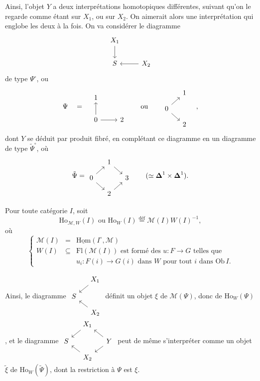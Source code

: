 \documentclass[11pt]{article}
\newcommand{\printedpage}[1]{\marginpar{\footnotesize p.~#1}}
\newcommand{\msp}[1]{\marginpar{\footnotesize [#1]}}
\newcommand{\Homu}{\underline{\mathrm{Hom}}}
\newcommand{\Ho}{\mathrm{Ho}}
\begin{document}
Ainsi, l'objet $Y$ a deux interprétations homotopiques différentes, suivant qu'on le regarde comme étant sur $X_1$, ou sur $X_2$. On aimerait alors une interprétation qui englobe les deux à la fois. On va considérer le diagramme
\[
\begin{tikzcd}[ampersand replacement=\&]
X_1 \arrow[d] \& \\
S \& X_2 \arrow[l]
\end{tikzcd}
\]
de type $\Psi^\circ$, ou
\[
\Psi \quad = \quad
\begin{tikzcd}[ampersand replacement=\&]
1 \& \\
0 \arrow[u] \arrow[r] \& 2
\end{tikzcd}
\qquad \text{ou} \qquad
\begin{tikzcd}[ampersand replacement=\&, row sep=small, column sep=small]
 \& 1 \\
0 \arrow[ur] \arrow[dr] \& \\
 \& 2
\end{tikzcd}
\quad ,
\]
\printedpage{157}
dont $Y$ se déduit par produit fibré, en complétant ce diagramme en un diagramme de type $\tilde{\Psi}^\circ$, où
\[
\tilde{\Psi} =
\begin{tikzcd}[ampersand replacement=\&, row sep=small, column sep=small]
 \& 1 \arrow[dr] \& \\
0 \arrow[ur] \arrow[dr] \& \& 3 \\
 \& 2 \arrow[ur] \&
\end{tikzcd}
\qquad (\simeq \boldsymbol{\Delta}^1 \times \boldsymbol{\Delta}^1).
\]

\msp{page 243}
Pour toute catégorie $I$, soit
\[
\Ho_{\mathcal{M},W}(I) \text{ \ ou \ } \Ho_W(I) \overset{\text{déf}}{=} \mathcal{M}(I)W(I)^{-1},
\]
où
\[
\left\{
\begin{array}{rcl}
\mathcal{M}(I) & = & \Homu(I^\circ, \mathcal{M}) \\[1ex]
W(I) & \subseteq & \mathrm{Fl}(\mathcal{M}(I)) \text{ est formé des } u : F \longrightarrow G \text{ telles que} \\[1ex]
 & & u_i : F(i) \longrightarrow G(i) \text{ dans } W \text{ pour tout } i \text{ dans } \mathrm{Ob}\, I.
\end{array}
\right.
\]

Ainsi, le diagramme $\vcenter{\hbox{\begin{tikzcd}[ampersand replacement=\&, row sep=small, column sep=small]
 \& X_1 \arrow[dl] \\
S \& \\
 \& X_2 \arrow[ul]
\end{tikzcd}}}$ définit un objet $\xi$ de $\mathcal{M}(\Psi)$, donc de $\Ho_W(\Psi)$, et le diagramme $\vcenter{\hbox{\begin{tikzcd}[ampersand replacement=\&, row sep=small, column sep=small]
 \& X_1 \arrow[dl] \& \\
S \& \& Y \arrow[ul] \arrow[dl] \\
 \& X_2 \arrow[ul] \&
\end{tikzcd}}}$ peut de même s'interpréter comme un objet $\tilde{\xi}$ de $\Ho_W(\tilde{\Psi})$, dont la restriction à $\Psi$ est $\xi$.
\end{document}
